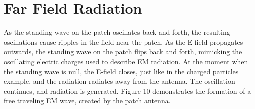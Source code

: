 \documentclass[12pt]{article}
\begin{document}
\section{Far Field Radiation}

As the standing wave on the patch oscillates back and forth, the resulting oscillations cause ripples in the field near the patch. As the E-field propagates outwards, the standing wave on the patch flips back and forth, mimicking the oscillating electric charges used to describe EM radiation. At the moment when the standing wave is null, the E-field closes, just like in the charged particles example, and the radiation radiates away from the antenna. The oscillation continues, and radiation is generated. Figure 10 demonstrates the formation of a free traveling EM wave, created by the patch antenna.
\end{document}
